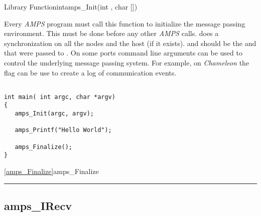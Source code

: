 \begin{deftypefn}{Library Function}{int}{amps\_Init}(int , char [])
\DESCRIPTION

Every {\em AMPS} program must call this function to initialize the
message passing environment.  This must be done before any other
{\em AMPS} calls.   does a synchronization on all the
nodes and the host (if it exists).   and  should be
the  and  that were passed to .  On some
ports command line arguments can be used to control the underlying
message passing system.  For example, on {\em Chameleon} the
 flag can be use to create a log of communication events.

\EXAMPLE

\begin{display}\begin{verbatim}

int main( int argc, char *argv)
{
   amps_Init(argc, argv);
   
   amps_Printf("Hello World");

   amps_Finalize();
}
\end{verbatim}\end{display}


\SEEALSO
\vref{amps_Finalize}{amps\_Finalize} \\

\end{deftypefn}


\noindent\rule{\textwidth}{1mm}

\subsection{amps\_IRecv}
\label{amps_IRecv}


